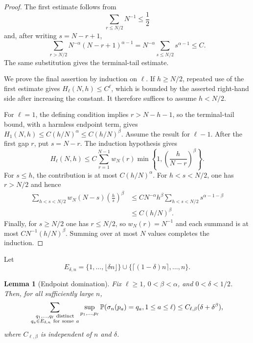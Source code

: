 \documentclass[11pt]{article}
\newtheorem{lemma}[theorem]{Lemma}
\theoremstyle{remark}
\newcommand{\Pp}{\mathbb P}
\begin{document}
\begin{proof}
The first estimate follows from
\[
 \sum_{r\le N/2}N^{-1}\le\frac12
\]
and, after writing $s=N-r+1$,
\[
 \sum_{r>N/2}N^{-\alpha}(N-r+1)^{\alpha-1}
 =N^{-\alpha}\sum_{s\le N/2}s^{\alpha-1}\le C.
\]
The same substitution gives the terminal-tail estimate.

We prove the final assertion by induction on $\ell$.  If $h\ge N/2$, repeated
use of the first estimate gives $H_\ell(N,h)\le C^\ell$, which is bounded by
the asserted right-hand side after increasing the constant.  It therefore
suffices to assume $h<N/2$.

For $\ell=1$, the defining condition implies $r>N-h-1$, so the terminal-tail
bound, with a harmless endpoint term, gives
$H_1(N,h)\le C(h/N)^\alpha\le C(h/N)^\beta$.
Assume the result for $\ell-1$.  After the first gap $r$, put $s=N-r$.
The induction hypothesis gives
\[
 H_\ell(N,h)
 \le C\sum_{r=1}^{N-1}w_N(r)
 \min\left\{1,\left(\frac h{N-r}\right)^\beta\right\}.
\]
For $s\le h$, the contribution is at most $C(h/N)^\alpha$.  For
$h<s<N/2$, one has $r>N/2$ and hence
\[
\begin{aligned}
 \sum_{h<s<N/2}w_N(N-s)\left(\frac hs\right)^\beta
 &\le C N^{-\alpha}h^\beta
 \sum_{h<s<N/2}s^{\alpha-1-\beta}\\
 &\le C(h/N)^\beta.
\end{aligned}
\]
Finally, for $s\ge N/2$ one has $r\le N/2$, so $w_N(r)=N^{-1}$ and each
summand is at most $CN^{-1}(h/N)^\beta$.  Summing over at most $N$ values
completes the induction.
\end{proof}

Let
\[
        E_{\delta,n}
        =\{1,\ldots,\lfloor\delta n\rfloor\}
        \cup
        \{\lceil(1-\delta)n\rceil,\ldots,n\}.
\]

\begin{lemma}[Endpoint domination]\label{lem:endpoint-dom}
Fix \(\ell\ge1\), \(0<\beta<\alpha\), and \(0<\delta<1/2\).  Then, for all sufficiently large \(n\),
\[
\sum_{\substack{q_1,
\ldots,q_\ell\ {\rm distinct}\\
q_a\in E_{\delta,n}\ {\rm for\ some}\ a}}
\sup_{p_1,\ldots,p_\ell}
\Pp(\sigma_n(p_a)=q_a,1\le a\le\ell)
\le C_{\ell,\beta}(\delta+\delta^\beta),
\]
where \(C_{\ell,\beta}\) is independent of \(n\) and \(\delta\).
\end{lemma}
\end{document}
